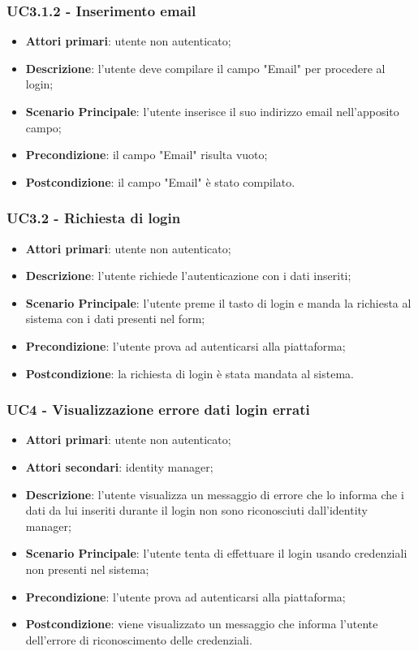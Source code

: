 \subsubsection{UC3.1.2 - Inserimento email}
\begin{itemize}
\item \textbf{Attori primari}: utente non autenticato;
\item \textbf{Descrizione}: l'utente deve compilare il campo "Email" per procedere al login;
\item \textbf{Scenario Principale}: l'utente inserisce il suo indirizzo email nell'apposito campo;
\item \textbf{Precondizione}: il campo "Email" risulta vuoto;
\item \textbf{Postcondizione}: il campo "Email" è stato compilato.
\end{itemize}

\subsubsection{UC3.2 - Richiesta di login}
\begin{itemize}
\item \textbf{Attori primari}: utente non autenticato;
\item \textbf{Descrizione}: l'utente richiede l'autenticazione con i dati inseriti;
\item \textbf{Scenario Principale}: l'utente preme il tasto di login e manda la richiesta al sistema con i dati presenti nel form;
\item \textbf{Precondizione}: l'utente prova ad autenticarsi alla piattaforma;
\item \textbf{Postcondizione}: la richiesta di login è stata mandata al sistema.
\end{itemize} 

\subsubsection{UC4 - Visualizzazione errore dati login errati}
\begin{itemize}
\item \textbf{Attori primari}: utente non autenticato;
\item \textbf{Attori secondari}: identity manager;
\item \textbf{Descrizione}: l'utente visualizza un messaggio di errore che lo informa che i dati da lui inseriti durante il login non sono riconosciuti dall'identity manager;
\item \textbf{Scenario Principale}: l'utente tenta di effettuare il login usando credenziali non presenti nel sistema;
\item \textbf{Precondizione}: l'utente prova ad autenticarsi alla piattaforma;
\item \textbf{Postcondizione}: viene visualizzato un messaggio che informa l'utente dell'errore di riconoscimento delle credenziali.
\end{itemize}